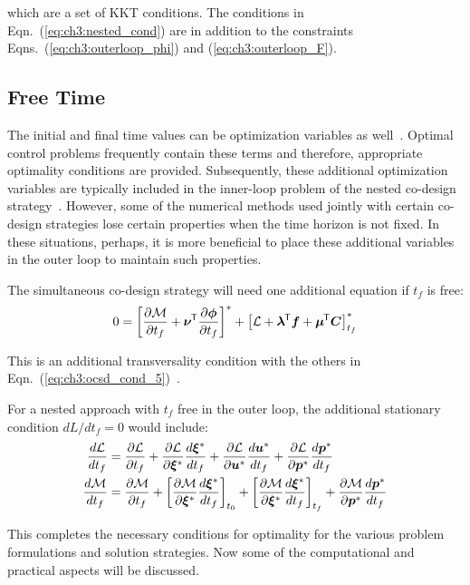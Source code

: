 \noindent which are a set of KKT conditions. The conditions in Eqn.~(\ref{eq:ch3:nested_cond}) are in addition to the constraints Eqns.~(\ref{eq:ch3:outerloop_phi}) and (\ref{eq:ch3:outerloop_F}).

\subsection{Free Time \label{sec:ch3:time}}

The initial and final time values can be optimization variables as well~\cite{Liberzon2012a, Chachuat2007a, Fathy2001a, Herber2014a}.  
Optimal control problems frequently contain these terms and therefore, appropriate optimality conditions are provided.
Subsequently, these additional optimization variables are typically included in the inner-loop problem of the nested co-design strategy~\cite{Fathy2001a}. 
However, some of the numerical methods used jointly with certain co-design strategies lose certain properties when the time horizon is not fixed.
In these situations, perhaps, it is more beneficial to place these additional variables in the outer loop to maintain such properties.

The simultaneous co-design strategy will need one additional equation if $t_f$ is free:
\begin{align}
0 = \left[\frac{\partial \mathcal{M}}{\partial t_f} + \bm{\nu}^{\mkern-1.5mu\mathsf{T}} \frac{\partial \bm{\phi}}{\partial t_f} \right]^* + \left[ \mathcal{L} + \bm{\lambda}^{\mkern-1.5mu\mathsf{T}} \bm{f} + \bm{\mu}^{\mkern-1.5mu\mathsf{T}} \bm{C} \right]^*_{t_f}
\end{align}

\noindent This is an additional transversality condition with the others in Eqn.~(\ref{eq:ch3:ocsd_cond_5})~\cite{Liberzon2012a, Chachuat2007a}.

For a nested approach with $t_f$ free in the outer loop, the additional stationary condition $d L / d t_f = 0$ would include: 
\begin{subequations}
\begin{align}
\frac{d \mathcal{L}}{d t_f} &= \frac{\partial \mathcal{L}}{\partial t_f} + \frac{\partial \mathcal{L}}{\partial \bm{\xi}^*}  \frac{d \bm{\xi}^*}{d t_f} + \frac{\partial \mathcal{L}}{\partial \bm{u}^*} \frac{d \bm{u}^*}{d t_f} + \frac{\partial \mathcal{L}}{\partial \bm{p}^*} \frac{d \bm{p}^*}{d t_f} \\
\frac{d \mathcal{M}}{d t_f} &= \frac{\partial \mathcal{M}}{\partial t_f} + \left[ \frac{\partial \mathcal{M}}{\partial \bm{\xi}^*}  \frac{d \bm{\xi}^*}{d t_f} \right]_{t_0} + \left[ \frac{\partial \mathcal{M}}{\partial \bm{\xi}^*}  \frac{d \bm{\xi}^*}{d t_f} \right]_{t_f} + \frac{\partial \mathcal{M}}{\partial \bm{p}^*}  \frac{d \bm{p}^*}{d t_f}
\end{align}
\end{subequations}

This completes the necessary conditions for optimality for the various problem formulations and solution strategies.
Now some of the computational and practical aspects will be discussed.


